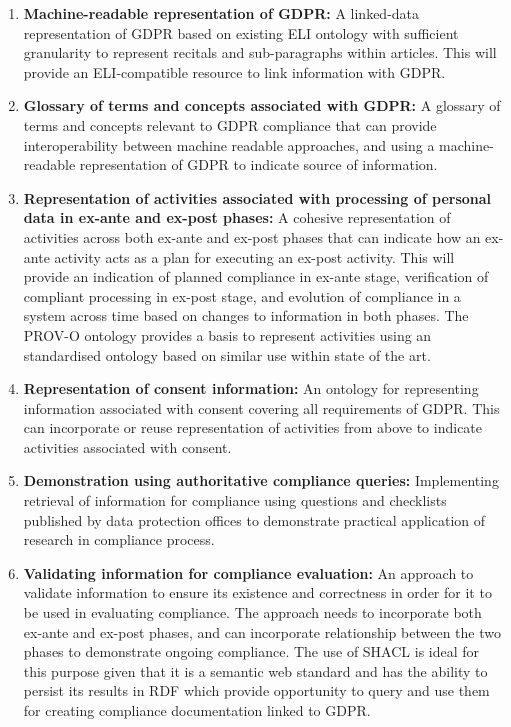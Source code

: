 \begin{enumerate}
\item \textbf{Machine-readable representation of GDPR:} A linked-data representation of GDPR based on existing ELI ontology with sufficient granularity to represent recitals and sub-paragraphs within articles. This will provide an ELI-compatible resource to link information with GDPR.
\item \textbf{Glossary of terms and concepts associated with GDPR:} A glossary of terms and concepts relevant to GDPR compliance that can provide interoperability between machine readable approaches, and using a machine-readable representation of GDPR to indicate source of information.
\item \textbf{Representation of activities associated with processing of personal data in ex-ante and ex-post phases:} A cohesive representation of activities across both ex-ante and ex-post phases that can indicate how an ex-ante activity acts as a plan for executing an ex-post activity. This will provide an indication of planned compliance in ex-ante stage, verification of compliant processing in ex-post stage, and evolution of compliance in a system across time based on changes to information in both phases. The PROV-O ontology provides a basis to represent activities using an standardised ontology based on similar use within state of the art.
\item \textbf{Representation of consent information:} An ontology for representing information associated with consent covering all requirements of GDPR. This can incorporate or reuse representation of activities from above to indicate activities associated with consent.
\item \textbf{Demonstration using authoritative compliance queries:} Implementing retrieval of information for compliance using questions and checklists published by data protection offices to demonstrate practical application of research in compliance process.
\item \textbf{Validating information for compliance evaluation:} An approach to validate information to ensure its existence and correctness in order for it to be used in evaluating compliance. The approach needs to incorporate both ex-ante and ex-post phases, and can incorporate relationship between the two phases to demonstrate ongoing compliance. The use of SHACL is ideal for this purpose given that it is a semantic web standard and has the ability to persist its results in RDF which provide opportunity to query and use them for creating compliance documentation linked to GDPR.
\end{enumerate}
